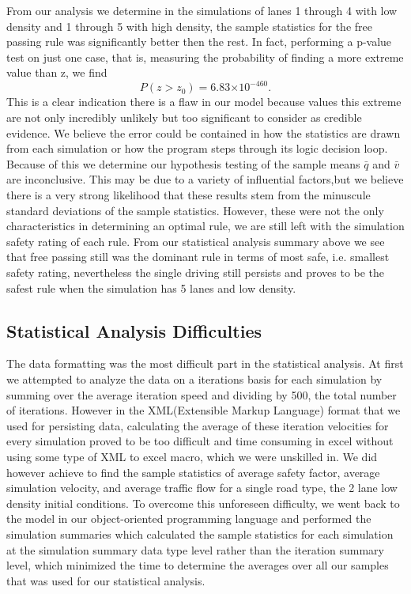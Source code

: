 \documentclass{amsart}
\providecommand{\e}[1]{\ensuremath{\times 10^{#1}}}
\begin{document}
	From our analysis we determine in the simulations of lanes 1 through 4 with low density and 1 through 5 with high density, the sample statistics for the free passing rule was significantly better then the rest. In fact, performing a p-value test on just one case, that is, measuring the probability of finding a more extreme value than z, we find 
	\[
		P( z > z_0) = 6.83 \e{-460}.
	\]
	This is a clear indication there is a flaw in our model because values this extreme are not only incredibly unlikely but too significant to consider as credible evidence. We believe the error could be contained in how the statistics are drawn from each simulation or how the program steps through its logic decision loop. Because of this we determine our hypothesis testing of the sample means $\bar q$ and $\bar v$ are inconclusive. This may be due to a variety of influential factors,but we believe there is a very strong likelihood that these results stem from the minuscule standard deviations of the sample statistics. However, these were not the only characteristics in determining an optimal rule, we are still left with the simulation safety rating of each rule. From our statistical analysis summary above we see that free passing still was the dominant rule in terms of most safe, i.e. smallest safety rating, nevertheless the single driving still persists and proves to be the safest rule when the simulation has 5 lanes and low density. 

	\subsection{Statistical Analysis Difficulties}
	The data formatting was the most difficult part in the statistical analysis. At first we attempted to analyze the data on a iterations basis for each simulation by summing over the average iteration speed and dividing by 500, the total number of iterations. However in the XML(Extensible Markup Language) format that we used for persisting data, calculating the average of these iteration velocities for every simulation proved to be too difficult and time consuming in excel without using some type of XML to excel macro, which we were unskilled in. We did however achieve to find the sample statistics of average safety factor, average simulation velocity, and average traffic flow for a single road type, the 2 lane low density initial conditions. To overcome this unforeseen difficulty, we went back to the model in our object-oriented programming language and performed the simulation summaries which calculated the sample statistics for each simulation at the simulation summary data type level rather than the iteration summary level, which minimized the time to determine the averages over all our samples that was used for our statistical analysis.
\end{document}
